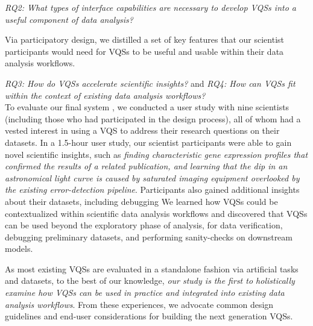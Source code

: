 \noindent \emph{RQ2: What types of interface capabilities are necessary to develop VQSs into a useful component of data analysis?}
\par Via participatory design, we distilled a set of key features that our scientist participants would
need for VQSs to be useful and usable within their data analysis workflows. 

\noindent \emph{RQ3: How do VQSs accelerate scientific insights?} and \emph{RQ4: How can VQSs fit within the context of existing data analysis workflows?}
\\ To evaluate our final system \zv, we conducted a user study with nine scientists (including those who had participated in the design process), all of whom had a vested interest in using a VQS to address their research questions on their datasets. In a 1.5-hour user study, our scientist participants were able to gain novel scientific insights, such as \emph{ finding characteristic gene expression profiles that confirmed the results of a related publication, and learning that the dip in an astronomical light curve is caused by saturated imaging equipment overlooked by the existing error-detection pipeline}.  Participants also gained additional insights about their datasets, including debugging 
We learned how VQSs could be contextualized within scientific data analysis workflows and discovered that VQSs can be used beyond the exploratory phase of analysis, for data verification, debugging preliminary datasets, and performing sanity-checks on downstream models.
\par As most existing VQSs are evaluated in a standalone fashion via artificial tasks and datasets, to the best of our knowledge, \emph{our study is the first to holistically examine how VQSs can be used in practice and integrated into existing data analysis workflows}. From these experiences, we advocate common design guidelines and end-user considerations for building the next generation VQSs.